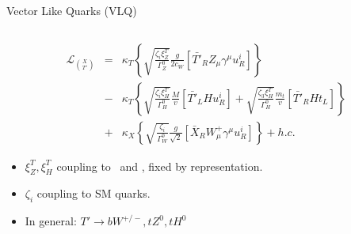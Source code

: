 \begin{frame}{Vector Like Quarks (VLQ)}
\begin{columns}
\begin{column}{.60\textwidth}
\tiny{
\begin{eqnarray}
  \mathcal{L}_{\binom{X}{T'}} & = & \kappa_{T}\left\{ \sqrt{\frac{\zeta_{i}\xi_{Z}^{T}}{\Gamma_{Z}^{0}}}\frac{g}{2c_{W}}\left[ \bar{T'}_{R}Z_{\mu}\gamma^{\mu}u^{i}_{R}\right]\right\} \nonumber\\
              & - & \kappa_{T}\left\{ \sqrt{\frac{\zeta_{i}\xi_{H}^{T}}{\Gamma_{H}^{0}}}\frac{M}{v}\left[ \bar{T'}_{L}Hu^{i}_{R}\right] + \sqrt{\frac{\zeta_{3}\xi_{H}^{T}}{\Gamma_{H}^{0}}}\frac{m_{t}}{v}\left[ \bar{T'}_{R}Ht_{L}\right]\right\} \nonumber\\            
              & + & \kappa_{X}\left\{ \sqrt{\frac{\zeta_{i}}{\Gamma_{W}^{0}}}\frac{g}{\sqrt{2}}\left[ \bar{X}_{R}W^{+}_{\mu}\gamma^{\mu}u^{i}_{R}\right]\right\} +h.c. \nonumber
\end{eqnarray}
}%
\vspace{-.2cm}
\begin{block}{}
\begin{itemize}\scriptsize
\item $\xi_{Z}^{T},\xi_{H}^{T}$ coupling to \Z~and \Hb, fixed by representation. 
\item $\zeta_{i}$ coupling to SM quarks.
\item In general: $T'\to bW^{+/-}, tZ^{0}, tH^{0}$
\end{itemize}
\end{block}

\end{column}
\end{columns}


\end{frame}
